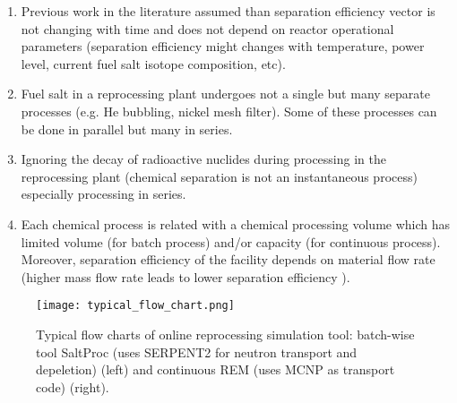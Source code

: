 \begin{enumerate}
	\item Previous work in the literature assumed than separation 
efficiency vector is not changing with time and does not depend on reactor 
operational parameters (separation efficiency might changes with temperature, 
power level, current fuel salt isotope composition, etc).

	\item Fuel salt in a reprocessing plant undergoes not a single but many 
	separate processes (e.g. He bubbling, nickel mesh filter). Some of 
	these processes can be done in parallel but many in series.
	
	\item Ignoring the decay of radioactive nuclides during processing in  
	the reprocessing plant (chemical separation is not an instantaneous process) 
	especially processing in series. 
	
	\item Each chemical process is related with a chemical processing volume 
	which has limited volume (for batch process) and/or capacity (for 
	continuous process). 
	Moreover, separation efficiency of the facility depends on material flow 
	rate (higher mass flow rate leads to lower separation efficiency 
	\cite{briggs_molten-salt_1969}).
\end{enumerate}

\begin{figure}[hbp!] %
  \texttt{[image: typical\_flow\_chart.png]}
  \caption{Typical flow charts of online reprocessing simulation tool:
  batch-wise tool SaltProc (uses SERPENT2 for neutron transport and 
  depeletion) \cite{rykhlevskii_modeling_2019}
   (left) and continuous  REM (uses MCNP as transport code) 
   \cite{heuer_simulation_2010} (right).} 
  \label{fig:typical_flow_chart}
\end{figure}

